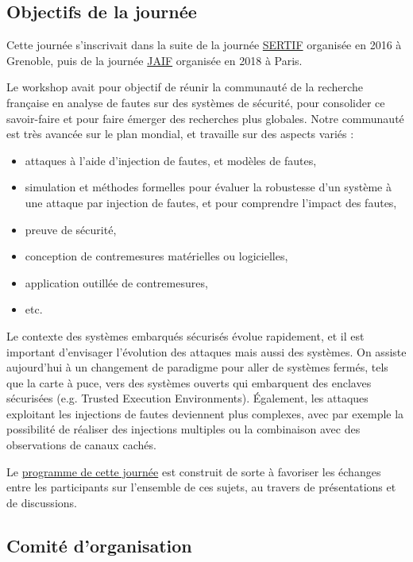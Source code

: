 \documentclass[a4paper,11pt]{article}
\begin{document}
\subsection{Objectifs de la journée}
\label{sec:org5596353}

Cette journée s’inscrivait dans la suite de la journée \href{https://lazart.gricad-pages.univ-grenoble-alpes.fr/sertif/pages/workshop.html}{SERTIF} organisée
en 2016 à Grenoble,
puis de la journée \href{https://wp-systeme.lip6.fr/jaif}{JAIF} organisée en 2018 à Paris.

Le workshop avait pour objectif de réunir la communauté de la
recherche française en analyse de fautes sur des systèmes de sécurité,
pour consolider ce savoir-faire et pour faire émerger des recherches
plus globales.  Notre communauté est très avancée sur le plan mondial,
et travaille sur des aspects variés :

\begin{itemize}
\item attaques à l'aide d'injection de fautes, et modèles de fautes,
\item simulation et méthodes formelles pour évaluer la robustesse d'un
système à une attaque par injection de fautes, et pour comprendre
l’impact des fautes,
\item preuve de sécurité,
\item conception de contremesures matérielles ou logicielles,
\item application outillée de contremesures,
\item etc.
\end{itemize}

Le contexte des systèmes embarqués sécurisés évolue
rapidement, et il est important d’envisager l’évolution des
attaques mais aussi des systèmes.
On assiste aujourd’hui à un changement de paradigme pour aller de
systèmes fermés, tels que la carte à puce, vers des systèmes ouverts qui
embarquent des enclaves sécurisées (e.g. Trusted Execution
Environments).  Également, les attaques exploitant les injections de
fautes deviennent plus complexes, avec par exemple la possibilité de
réaliser des injections multiples ou la combinaison avec des
observations de canaux cachés.

Le \href{./programme.html}{programme de cette journée} est construit de sorte à favoriser les échanges entre les participants sur
l’ensemble de ces sujets, au travers de présentations et de
discussions.

\subsection{Comité d'organisation}
\label{sec:org03f63be}
\end{document}
